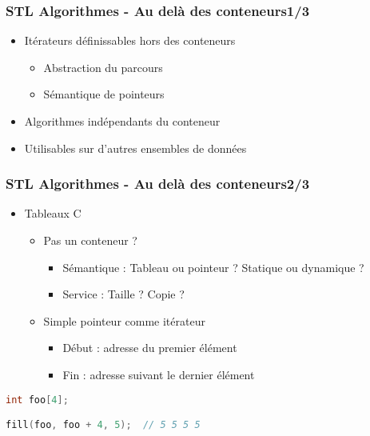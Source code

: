 \documentclass[C++.tex]{subfiles}
\begin{document}
\begin{frame}
	\frametitle{STL Algorithmes - Au delà des conteneurs\titlehfill{}1/3}
	\begin{itemize}
		\item Itérateurs définissables hors des conteneurs
		\begin{itemize}
			\item Abstraction du parcours
			\item Sémantique de pointeurs
		\end{itemize}
		\item Algorithmes indépendants du conteneur
		\item Utilisables sur d'autres ensembles de données
	\end{itemize}
\end{frame}

\begin{frame}[fragile]
	\frametitle{STL Algorithmes - Au delà des conteneurs\titlehfill{}2/3}
	\begin{itemize}
		\item Tableaux C
		\begin{itemize}
			\item Pas un conteneur ?


			\begin{itemize}
				\item Sémantique : Tableau ou pointeur ? Statique ou dynamique ?
				\item Service : Taille ? Copie ?
			\end{itemize}
			\item Simple pointeur comme itérateur
			\begin{itemize}
				\item Début : adresse du premier élément
				\item Fin : adresse suivant le dernier élément
			\end{itemize}
		\end{itemize}
	\end{itemize}

	\begin{lstlisting}[language=C++]
int foo[4];

fill(foo, foo + 4, 5);  // 5 5 5 5\end{lstlisting}
\end{frame}
\end{document}
